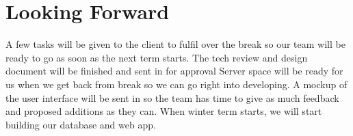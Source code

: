 \documentclass[draftclsnofoot,onecolumn,letterpaper,10pt,compsoc]{IEEEtran}
\begin{document}
\section{Looking Forward}
A few tasks will be given to the client to fulfil over the break so our team will be ready to go as soon as the next term starts.
The tech review and design document will be finished and sent in for approval
Server space will be ready for us when we get back from break so we can go right into developing.
A mockup of the user interface will be sent in so the team has time to give as much feedback and proposed additions as they can.
When winter term starts, we will start building our database and web app.
\end{document}
